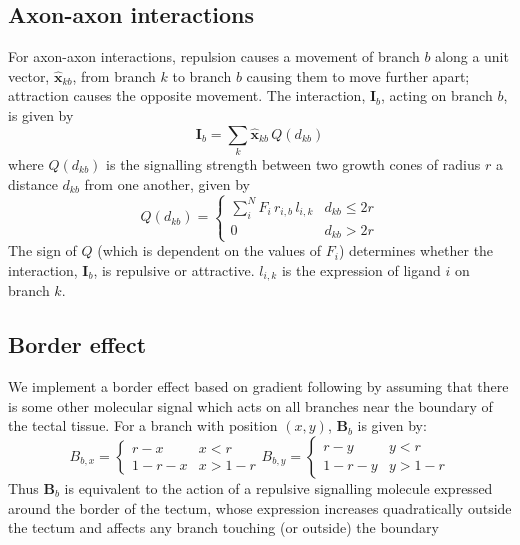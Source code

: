 \documentclass[11pt, a4paper]{article}
\begin{document}
\subsection*{Axon-axon interactions}

For axon-axon interactions, repulsion causes a movement of branch $b$ along a
unit vector, $\hat{\mathbf{x}}_{kb}$, from branch $k$ to branch $b$ causing
them to move further apart; attraction causes the opposite movement. The
interaction, $\mathbf{I}_b$, acting on branch $b$, is given by
%
\begin{equation}
\mathbf{I}_b = \sum_k \hat{\mathbf{x}}_{kb}\,Q(d_{kb})
\end{equation}
%
where $Q(d_{kb})$ is the signalling strength between two growth cones of
radius $r$ a distance $d_{kb}$ from one another, given by
%
\begin{equation}
Q(d_{kb}) = \begin{cases}
     \sum_i^N F_i\,r_{i,b}\,l_{i,k}    & d_{kb} \leq 2r \\
     0 & d_{kb} > 2r
     \end{cases}
\end{equation}
%
The sign of $Q$ (which is dependent on the values of $F_i$) determines whether
the interaction, $\mathbf{I}_b$, is repulsive or attractive. $l_{i,k}$ is the
expression of ligand $i$ on branch $k$.

\subsection*{Border effect}

We implement a border effect based on gradient following by assuming that
there is some other molecular signal which acts on all branches near the
boundary of the tectal tissue. For a branch with position $(x,y)$, $\mathbf{B}_b$ is
given by:
%
\begin{equation}
B_{b,x} = \begin{cases}
        r-x      & x<r \\
        1-r-x    & x>1-r
\end{cases}
B_{b,y} = \begin{cases}
        r-y      & y<r \\
        1-r-y    & y>1-r
\end{cases}
\end{equation}
%
Thus $\mathbf{B}_b$ is equivalent to the action of a repulsive signalling
molecule expressed around the border of the tectum, whose expression increases
quadratically outside the tectum and affects any branch touching (or outside)
the boundary
\end{document}
